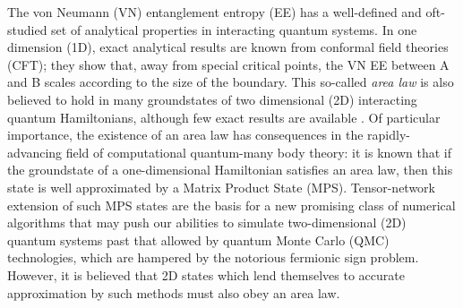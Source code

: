 \documentclass[prl,aps,twocolumn,floatfix,amsmath,amssymb,superscriptaddress,tightenlines]{revtex4}
\begin{document}
The von Neumann (VN) entanglement entropy (EE) has a well-defined and
oft-studied set of analytical properties in interacting quantum systems.
In one dimension (1D), exact analytical results are known from conformal
field theories (CFT); they show that, away from special critical points,
the VN EE between A and B scales according to the size of the boundary.
This so-called {\it area law} is also believed to hold in many
groundstates of two dimensional (2D) interacting quantum Hamiltonians,
although few exact results are available \cite{ALreview}.  Of particular
importance, the existence of an area law has consequences in the
rapidly-advancing field of computational quantum-many body theory: it is
known that if the groundstate of a one-dimensional Hamiltonian satisfies
an area law, then this state is well approximated by a Matrix Product
State (MPS).  Tensor-network extension of such MPS states are the basis
for a new promising class of numerical algorithms that may push our
abilities to simulate two-dimensional (2D) quantum systems past that
allowed by quantum Monte Carlo (QMC) technologies, which are hampered by
the notorious fermionic sign problem.  However, it is believed that 2D
states which lend themselves to accurate approximation by such methods
must also obey an area law.

\end{document}
